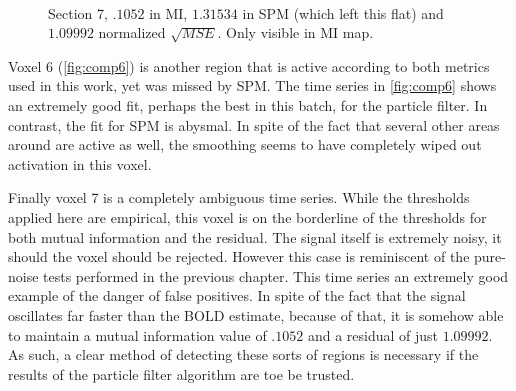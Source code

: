 \begin{figure}
\\
\caption{Section 7, $.1052$ in MI, $1.31534$ in SPM (which left this flat) and $1.09992$ normalized $\sqrt{MSE}$. Only visible in MI map. }
\label{fig:comp7}
\end{figure}

Voxel 6 (\autoref{fig:comp6}) is another region that is active according to both metrics used
in this work, yet was missed by SPM. The time series in \autoref{fig:comp6} shows an extremely
good fit, perhaps the best in this batch, for the particle filter. In contrast, the
fit for SPM is abysmal. In spite of the fact that several other areas around are active
as well, the smoothing seems to have completely wiped out activation in this voxel. 

Finally voxel 7 is a completely ambiguous time series. While the thresholds applied here
are empirical, this voxel is on the borderline of the thresholds for both mutual information
and the residual. The signal itself is extremely noisy, it should the voxel should be rejected.
However this case is reminiscent of the pure-noise tests performed in the previous chapter. 
This time series an extremely good example of the danger of false positives. In spite of the
fact that the signal oscillates far faster than the BOLD estimate, because of that, it is somehow
able to maintain a mutual information value of $.1052$ and a residual of just $1.09992$.
As such, a clear method of detecting these sorts of regions is necessary if the results
of the particle filter algorithm are toe be trusted. 

